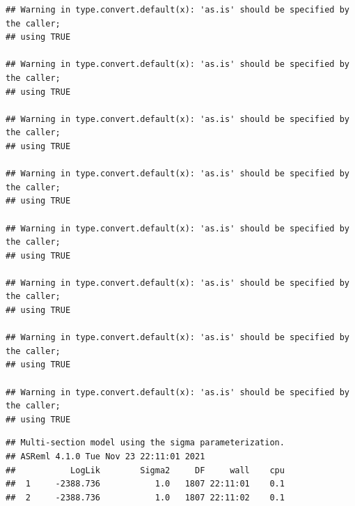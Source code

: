 \documentclass[
  12pt,
]{book}
\newenvironment{Shaded}{\begin{snugshade}}{\end{snugshade}}
\newcommand{\KeywordTok}[1]{\textcolor[rgb]{0.13,0.29,0.53}{\textbf{#1}}}
\newcommand{\NormalTok}[1]{#1}
\newcommand{\OperatorTok}[1]{\textcolor[rgb]{0.81,0.36,0.00}{\textbf{#1}}}
\begin{document}
\begin{verbatim}
## Warning in type.convert.default(x): 'as.is' should be specified by the caller;
## using TRUE

## Warning in type.convert.default(x): 'as.is' should be specified by the caller;
## using TRUE

## Warning in type.convert.default(x): 'as.is' should be specified by the caller;
## using TRUE

## Warning in type.convert.default(x): 'as.is' should be specified by the caller;
## using TRUE

## Warning in type.convert.default(x): 'as.is' should be specified by the caller;
## using TRUE

## Warning in type.convert.default(x): 'as.is' should be specified by the caller;
## using TRUE

## Warning in type.convert.default(x): 'as.is' should be specified by the caller;
## using TRUE

## Warning in type.convert.default(x): 'as.is' should be specified by the caller;
## using TRUE
\end{verbatim}

\begin{verbatim}
## Multi-section model using the sigma parameterization.
## ASReml 4.1.0 Tue Nov 23 22:11:01 2021
##           LogLik        Sigma2     DF     wall    cpu
##  1     -2388.736           1.0   1807 22:11:01    0.1
##  2     -2388.736           1.0   1807 22:11:02    0.1
\end{verbatim}

\begin{Shaded}
\end{Shaded}
\end{document}
